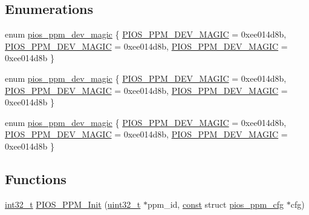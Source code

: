 \subsection*{Enumerations}
\begin{DoxyCompactItemize}
\item 
enum \hyperlink{group___p_i_o_s___p_p_m_ga6d320e57fe875e76b2fa71a688f865aa}{pios\-\_\-ppm\-\_\-dev\-\_\-magic} \{ \hyperlink{group___p_i_o_s___p_p_m_gga6d320e57fe875e76b2fa71a688f865aaa9a5d0c6d6ee7bcb5178168a65cf9deee}{P\-I\-O\-S\-\_\-\-P\-P\-M\-\_\-\-D\-E\-V\-\_\-\-M\-A\-G\-I\-C} = 0xee014d8b, 
\hyperlink{group___p_i_o_s___p_p_m_gga6d320e57fe875e76b2fa71a688f865aaa9a5d0c6d6ee7bcb5178168a65cf9deee}{P\-I\-O\-S\-\_\-\-P\-P\-M\-\_\-\-D\-E\-V\-\_\-\-M\-A\-G\-I\-C} = 0xee014d8b, 
\hyperlink{group___p_i_o_s___p_p_m_gga6d320e57fe875e76b2fa71a688f865aaa9a5d0c6d6ee7bcb5178168a65cf9deee}{P\-I\-O\-S\-\_\-\-P\-P\-M\-\_\-\-D\-E\-V\-\_\-\-M\-A\-G\-I\-C} = 0xee014d8b
 \}
\item 
enum \hyperlink{group___p_i_o_s___p_p_m_ga6d320e57fe875e76b2fa71a688f865aa}{pios\-\_\-ppm\-\_\-dev\-\_\-magic} \{ \hyperlink{group___p_i_o_s___p_p_m_gga6d320e57fe875e76b2fa71a688f865aaa9a5d0c6d6ee7bcb5178168a65cf9deee}{P\-I\-O\-S\-\_\-\-P\-P\-M\-\_\-\-D\-E\-V\-\_\-\-M\-A\-G\-I\-C} = 0xee014d8b, 
\hyperlink{group___p_i_o_s___p_p_m_gga6d320e57fe875e76b2fa71a688f865aaa9a5d0c6d6ee7bcb5178168a65cf9deee}{P\-I\-O\-S\-\_\-\-P\-P\-M\-\_\-\-D\-E\-V\-\_\-\-M\-A\-G\-I\-C} = 0xee014d8b, 
\hyperlink{group___p_i_o_s___p_p_m_gga6d320e57fe875e76b2fa71a688f865aaa9a5d0c6d6ee7bcb5178168a65cf9deee}{P\-I\-O\-S\-\_\-\-P\-P\-M\-\_\-\-D\-E\-V\-\_\-\-M\-A\-G\-I\-C} = 0xee014d8b
 \}
\item 
enum \hyperlink{group___p_i_o_s___p_p_m_ga6d320e57fe875e76b2fa71a688f865aa}{pios\-\_\-ppm\-\_\-dev\-\_\-magic} \{ \hyperlink{group___p_i_o_s___p_p_m_gga6d320e57fe875e76b2fa71a688f865aaa9a5d0c6d6ee7bcb5178168a65cf9deee}{P\-I\-O\-S\-\_\-\-P\-P\-M\-\_\-\-D\-E\-V\-\_\-\-M\-A\-G\-I\-C} = 0xee014d8b, 
\hyperlink{group___p_i_o_s___p_p_m_gga6d320e57fe875e76b2fa71a688f865aaa9a5d0c6d6ee7bcb5178168a65cf9deee}{P\-I\-O\-S\-\_\-\-P\-P\-M\-\_\-\-D\-E\-V\-\_\-\-M\-A\-G\-I\-C} = 0xee014d8b, 
\hyperlink{group___p_i_o_s___p_p_m_gga6d320e57fe875e76b2fa71a688f865aaa9a5d0c6d6ee7bcb5178168a65cf9deee}{P\-I\-O\-S\-\_\-\-P\-P\-M\-\_\-\-D\-E\-V\-\_\-\-M\-A\-G\-I\-C} = 0xee014d8b
 \}
\end{DoxyCompactItemize}
\subsection*{Functions}
\begin{DoxyCompactItemize}
\item 
\hyperlink{group___n_a_m_e_gafd12020da5a235dfcf0c3c748fb5baed}{int32\-\_\-t} \hyperlink{group___p_i_o_s___p_p_m_gae783c54c1c2f93d9cb8525c3bacbdc4e}{P\-I\-O\-S\-\_\-\-P\-P\-M\-\_\-\-Init} (\hyperlink{stdint_8h_a435d1572bf3f880d55459d9805097f62}{uint32\-\_\-t} $\ast$ppm\-\_\-id, \hyperlink{group___n_a_m_e_ga7ae6d0e43244213b34de2c2b9aa30da6}{const} struct \hyperlink{structpios__ppm__cfg}{pios\-\_\-ppm\-\_\-cfg} $\ast$cfg)
\end{DoxyCompactItemize}
